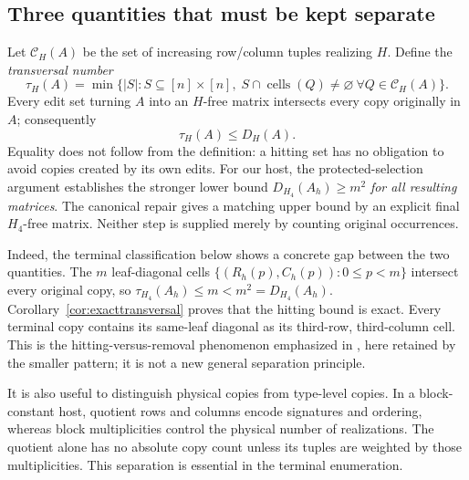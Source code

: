\subsection{Three quantities that must be kept separate}
Let $\mathcal C_H(A)$ be the set of increasing row/column tuples
realizing $H$. Define the \emph{transversal number}
\[
 \tau_H(A)=\min\{|S|: S\subseteq[n]\times[n],\;
                 S\cap\operatorname{cells}(Q)\ne\varnothing
                 \ \forall Q\in\mathcal C_H(A)\}.
\]
Every edit set turning $A$ into an $H$-free matrix intersects every
copy originally in $A$; consequently
\begin{equation}\label{eq:hitting_le}
 \tau_H(A)\le D_H(A).
\end{equation}
Equality does not follow from the definition: a hitting set has no
obligation to avoid copies created by its own edits.  For our host,
the protected-selection argument establishes the stronger lower bound
$D_{H_4}(A_h)\ge m^2$ \emph{for all resulting matrices}.  The
canonical repair gives a matching upper bound by an explicit final
$H_4$-free matrix.  Neither step is supplied merely by counting
original occurrences.

Indeed, the terminal classification below shows a concrete gap between
the two quantities. The $m$ leaf-diagonal cells
$\{(R_h(p),C_h(p)):0\le p<m\}$ intersect every original copy,
so $\tau_{H_4}(A_h)\le m<m^2=D_{H_4}(A_h)$.
Corollary~\ref{cor:exacttransversal} proves that the hitting bound is exact.
Every terminal copy contains its same-leaf diagonal as its
third-row, third-column cell. This is the hitting-versus-removal
phenomenon emphasized in \cite{OAI}, here retained by the smaller
pattern; it is not a new general separation principle.

It is also useful to distinguish physical copies from type-level
copies. In a block-constant host, quotient rows and columns encode
signatures and ordering, whereas block multiplicities control the
physical number of realizations. The quotient alone has no absolute
copy count unless its tuples are weighted by those multiplicities.
This separation is essential in the terminal enumeration.

